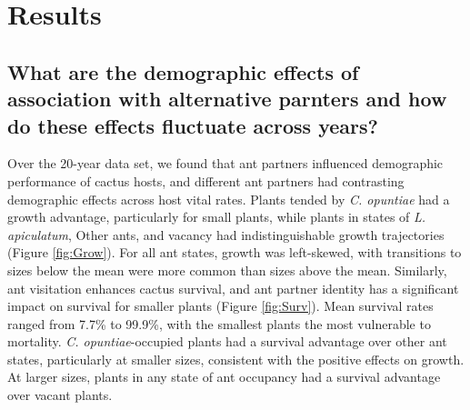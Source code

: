 \documentclass[11pt]{article}
\begin{document}
 
\section*{Results}
\subsection*{What are the demographic effects of association with alternative parnters and how do these effects fluctuate across years?}
Over the 20-year data set, we found that ant partners influenced demographic performance of cactus hosts, and different ant partners had contrasting demographic effects across host vital rates. 
Plants tended by \textit{C. opuntiae} had a growth advantage, particularly for small plants, while plants in states of \textit{L. apiculatum}, Other ants, and vacancy had indistinguishable growth trajectories (Figure \ref{fig:Grow}).
For all ant states, growth was left-skewed, with transitions to sizes below the mean were more common than sizes above the mean. 
Similarly, ant visitation enhances cactus survival, and ant partner identity has a significant impact on survival for smaller plants (Figure \ref{fig:Surv}).
Mean survival rates ranged from 7.7\% to 99.9\%, with the smallest plants the most vulnerable to mortality. 
\textit{C. opuntiae}-occupied plants had a survival advantage over other ant states, particularly at smaller sizes, consistent with the positive effects on growth. 
At larger sizes, plants in any state of ant occupancy had a survival advantage over vacant plants. 
\end{document}
